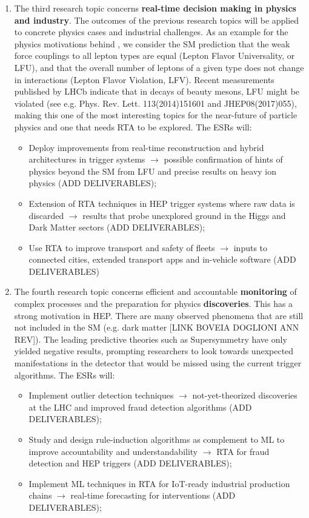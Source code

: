 \begin{enumerate}
\item The third research topic concerns \textbf{real-time decision making in physics and industry}. 
The outcomes of the previous research topics will be applied to concrete physics cases and industrial challenges. 
As an example for the physics motivations behind \acronym, we consider the SM prediction that the weak force couplings to all lepton types are equal (Lepton Flavor Universality, or LFU), and that the overall number of leptons of a given type does not change in interactions (Lepton Flavor Violation, LFV). 
Recent measurements published by LHCb indicate that in decays of beauty mesons, LFU might be violated (see e.g. Phys. Rev. Lett. 113(2014)151601 and JHEP08(2017)055), making this one of the most interesting topics for the near-future of particle physics and one that needs RTA to be explored. 
The \acronym ESRs will: 
\begin{itemize}
\item Deploy improvements from real-time reconstruction and hybrid architectures in trigger systems $\rightarrow$ possible confirmation of hints of physics beyond the SM from LFU and precise results on heavy ion physics (ADD DELIVERABLES);
\item Extension of RTA techniques in HEP trigger systems where raw data is discarded $\rightarrow$ results that probe unexplored ground in the Higgs and Dark Matter sectors (ADD DELIVERABLES);
\item Use RTA to improve transport and safety of fleets $\rightarrow$ inputs to connected cities, extended transport apps and in-vehicle software (ADD DELIVERABLES)
\end{itemize}

\item The fourth research topic concerns efficient and accountable \textbf{monitoring} of complex processes and the preparation for physics \textbf{discoveries}. 
This has a strong motivation in HEP. 
There are many observed phenomena that are still not included in the SM (e.g. dark matter [LINK BOVEIA DOGLIONI ANN REV]). 
The leading predictive theories such as Supersymmetry have only yielded negative results, prompting researchers to look towards unexpected manifestations in the detector that would be missed using the current trigger algorithms. 
The \acronym ESRs will:
\begin{itemize}
\item Implement outlier detection techniques $\rightarrow$ not-yet-theorized discoveries at the LHC and improved fraud detection algorithms (ADD DELIVERABLES);
\item Study and design rule-induction algorithms as complement to ML to improve accountability and understandability $\rightarrow$ RTA for fraud detection and HEP triggers (ADD DELIVERABLES);
\item Implement ML techniques in RTA for IoT-ready industrial production chains $\rightarrow$ real-time forecasting for interventions (ADD DELIVERABLES);
\end{itemize}

\end{enumerate} 

